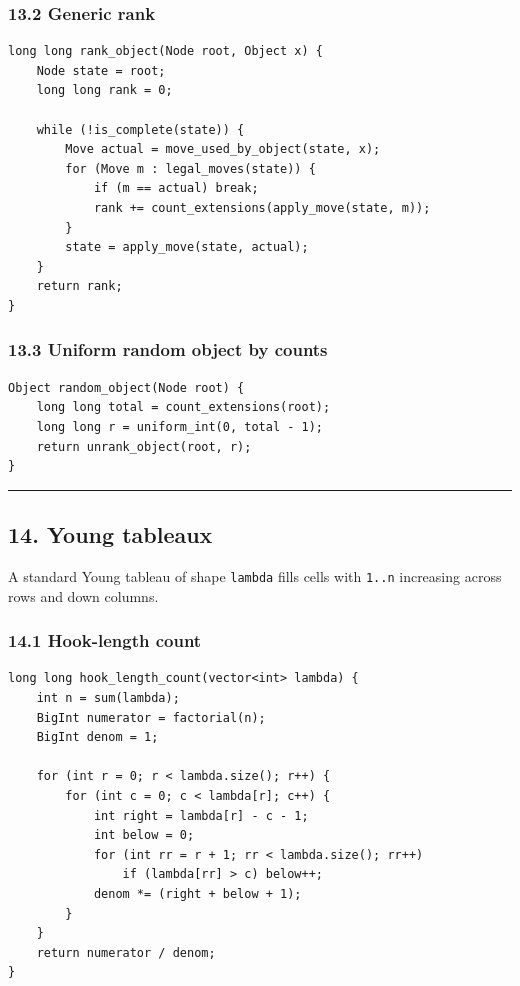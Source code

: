 \documentclass[11pt]{article}
\begin{document}
\subsubsection{13.2 Generic rank}\label{generic-rank}

\begin{verbatim}
long long rank_object(Node root, Object x) {
    Node state = root;
    long long rank = 0;

    while (!is_complete(state)) {
        Move actual = move_used_by_object(state, x);
        for (Move m : legal_moves(state)) {
            if (m == actual) break;
            rank += count_extensions(apply_move(state, m));
        }
        state = apply_move(state, actual);
    }
    return rank;
}
\end{verbatim}

\subsubsection{13.3 Uniform random object by counts}\label{uniform-random-object-by-counts}

\begin{verbatim}
Object random_object(Node root) {
    long long total = count_extensions(root);
    long long r = uniform_int(0, total - 1);
    return unrank_object(root, r);
}
\end{verbatim}

\begin{center}\rule{0.5\linewidth}{0.5pt}\end{center}

\subsection{14. Young tableaux}\label{young-tableaux}

A standard Young tableau of shape \texttt{lambda} fills cells with \texttt{1..n} increasing across rows and down columns.

\subsubsection{14.1 Hook-length count}\label{hook-length-count}

\begin{verbatim}
long long hook_length_count(vector<int> lambda) {
    int n = sum(lambda);
    BigInt numerator = factorial(n);
    BigInt denom = 1;

    for (int r = 0; r < lambda.size(); r++) {
        for (int c = 0; c < lambda[r]; c++) {
            int right = lambda[r] - c - 1;
            int below = 0;
            for (int rr = r + 1; rr < lambda.size(); rr++)
                if (lambda[rr] > c) below++;
            denom *= (right + below + 1);
        }
    }
    return numerator / denom;
}
\end{verbatim}
\end{document}
